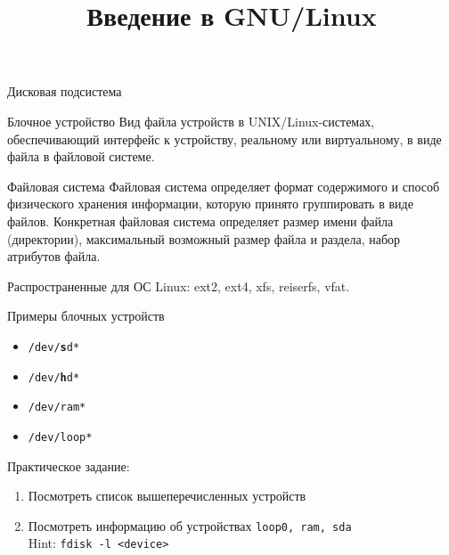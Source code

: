 

\title{Введение в GNU/Linux}








\frame{
	\tableofcontents
}


\begin{frame}{Дисковая подсистема}

	\begin{block}{Блочное устройство}
		Вид файла устройств в UNIX/Linux-системах,  обеспечивающий интерфейс к устройству,
		реальному или виртуальному, в виде файла в файловой системе.
	\end{block}

	\begin{block}{Файловая система}
		Файловая система определяет формат содержимого и способ физического хранения информации,  
		которую принято группировать в виде файлов. 
		Конкретная файловая система определяет размер имени файла (директории),  
		максимальный возможный размер файла и раздела,  набор атрибутов файла.

		Распространенные для ОС Linux: ext2, ext4, xfs, reiserfs, vfat.
	\end{block}
\end{frame}

\begin{frame}{Примеры блочных устройств}

	\begin{itemize}
		\item {\tt /dev/{\bf s}d*}
		\item {\tt /dev/{\bf h}d*}
		\item {\tt /dev/ram*}
		\item {\tt /dev/loop*}
	\end{itemize}

	\begin{block}{Практическое задание:}
		\begin{enumerate}
			\item Посмотреть список вышеперечисленных устройств
			\item Посмотреть информацию об устройствах {\tt loop0, ram, sda}\\
				Hint: {\tt fdisk -l <device>}
		\end{enumerate}
	\end{block}
\end{frame}

